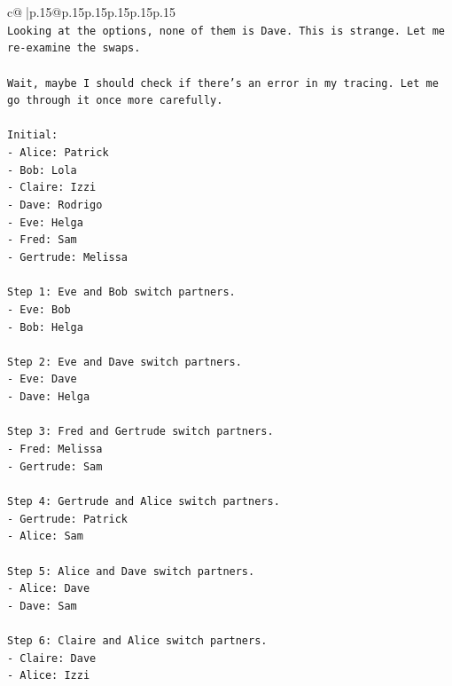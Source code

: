 \documentclass{article}
\begin{document}
{\begin{supertabular}{c@{$\;$}|p{.15\linewidth}@{}p{.15\linewidth}p{.15\linewidth}p{.15\linewidth}p{.15\linewidth}p{.15\linewidth}}
{{{\\ 
\texttt{Looking at the options, none of them is Dave. This is strange. Let me re{-}examine the swaps.} \\
\\ 
\texttt{Wait, maybe I should check if there's an error in my tracing. Let me go through it once more carefully.} \\
\\ 
\texttt{Initial:} \\
\texttt{{-} Alice: Patrick} \\
\texttt{{-} Bob: Lola} \\
\texttt{{-} Claire: Izzi} \\
\texttt{{-} Dave: Rodrigo} \\
\texttt{{-} Eve: Helga} \\
\texttt{{-} Fred: Sam} \\
\texttt{{-} Gertrude: Melissa} \\
\\ 
\texttt{Step 1: Eve and Bob switch partners.} \\
\texttt{{-} Eve: Bob} \\
\texttt{{-} Bob: Helga} \\
\\ 
\texttt{Step 2: Eve and Dave switch partners.} \\
\texttt{{-} Eve: Dave} \\
\texttt{{-} Dave: Helga} \\
\\ 
\texttt{Step 3: Fred and Gertrude switch partners.} \\
\texttt{{-} Fred: Melissa} \\
\texttt{{-} Gertrude: Sam} \\
\\ 
\texttt{Step 4: Gertrude and Alice switch partners.} \\
\texttt{{-} Gertrude: Patrick} \\
\texttt{{-} Alice: Sam} \\
\\ 
\texttt{Step 5: Alice and Dave switch partners.} \\
\texttt{{-} Alice: Dave} \\
\texttt{{-} Dave: Sam} \\
\\ 
\texttt{Step 6: Claire and Alice switch partners.} \\
\texttt{{-} Claire: Dave} \\
\texttt{{-} Alice: Izzi} \\
}}}
\end{supertabular}}
\end{document}
